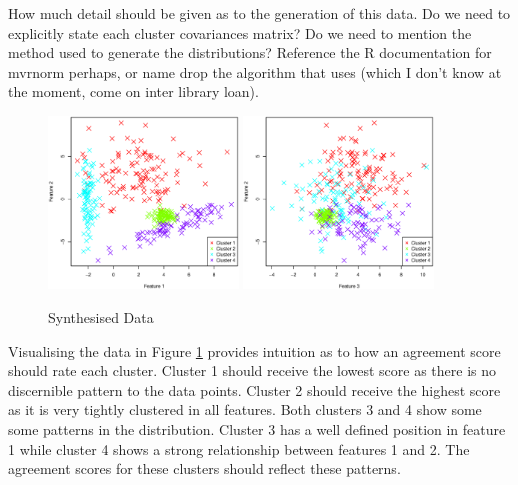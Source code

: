			\note
			{
				How much detail should be given as to the generation of this data. Do we need to explicitly
				state each cluster covariances matrix? Do we need to mention the method used to generate
				the distributions? Reference the R documentation for mvrnorm perhaps, or name drop the
				algorithm that uses (which I don't know at the moment, come on inter library loan).
			}

			\begin{figure}[h!]
				\centering
				\subfloat
				{
					\includegraphics[width=0.45\textwidth]{chapter4/Images/ArtificialData1-2.eps}
					\label{fig:EqualiserDifferencePCA}
				}
				\qquad
				\subfloat
				{
					\includegraphics[width=0.45\textwidth]{chapter4/Images/ArtificialData3-2.eps}
					\label{fig:EqualiserDifferenceCentroidsPCA}
				}
				\caption{Synthesised Data}
				\label{fig:SynthesisedData}
			\end{figure}

			Visualising the data in Figure \ref{fig:SynthesisedData} provides intuition as to how an agreement
			score should rate each cluster. Cluster 1 should receive the lowest score as there is no
			discernible pattern to the data points. Cluster 2 should receive the highest score as it is very
			tightly clustered in all features. Both clusters 3 and 4 show some some patterns in the
			distribution. Cluster 3 has a well defined position in feature 1 while cluster 4 shows a strong
			relationship between features 1 and 2. The agreement scores for these clusters should reflect these
			patterns.

